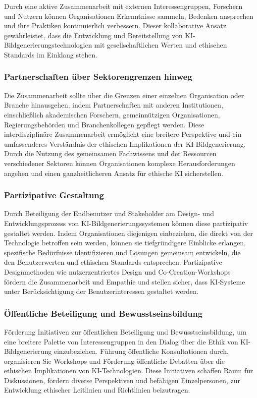 \documentclass[12pt]{article}
\begin{document}
Durch eine aktive Zusammenarbeit mit externen Interessengruppen, Forschern und Nutzern können Organisationen Erkenntnisse sammeln, Bedenken ansprechen und ihre Praktiken kontinuierlich verbessern. Dieser kollaborative Ansatz gewährleistet, dass die Entwicklung und Bereitstellung von KI-Bildgenerierungstechnologien mit gesellschaftlichen Werten und ethischen Standards im Einklang stehen.

\subsubsection{Partnerschaften über Sektorengrenzen hinweg}
Die Zusammenarbeit sollte über die Grenzen einer einzelnen Organisation oder Branche hinausgehen, indem Partnerschaften mit anderen Institutionen, einschließlich akademischen Forschern, gemeinnützigen Organisationen, Regierungsbehörden und Branchenkollegen gepflegt werden. Diese interdisziplinäre Zusammenarbeit ermöglicht eine breitere Perspektive und ein umfassenderes Verständnis der ethischen Implikationen der KI-Bildgenerierung. Durch die Nutzung des gemeinsamen Fachwissens und der Ressourcen verschiedener Sektoren können Organisationen komplexe Herausforderungen angehen und einen ganzheitlicheren Ansatz für ethische KI sicherstellen.

\subsubsection{Partizipative Gestaltung}
Durch Beteiligung der Endbenutzer und Stakeholder am Design- und Entwicklungsprozess von KI-Bildgenerierungssystemen können diese partizipativ gestaltet werden. Indem Organisationen diejenigen einbeziehen, die direkt von der Technologie betroffen sein werden, können sie tiefgründigere Einblicke erlangen, spezifische Bedürfnisse identifizieren und Lösungen gemeinsam entwickeln, die den Benutzerwerten und ethischen Standards entsprechen. Partizipative Designmethoden wie nutzerzentriertes Design und Co-Creation-Workshops fördern die Zusammenarbeit und Empathie und stellen sicher, dass KI-Systeme unter Berücksichtigung der Benutzerinteressen gestaltet werden.
\cite{Vogel}
\subsubsection{Öffentliche Beteiligung und Bewusstseinsbildung}
Förderung Initiativen zur öffentlichen Beteiligung und Bewusstseinsbildung, um eine breitere Palette von Interessengruppen in den Dialog über die Ethik von KI-Bildgenerierung einzubeziehen. Führung öffentliche Konsultationen durch, organisieren Sie Workshops und Förderung öffentliche Debatten über die ethischen Implikationen von KI-Technologien. Diese Initiativen schaffen Raum für Diskussionen, fördern diverse Perspektiven und befähigen Einzelpersonen, zur Entwicklung ethischer Leitlinien und Richtlinien beizutragen.
\end{document}
